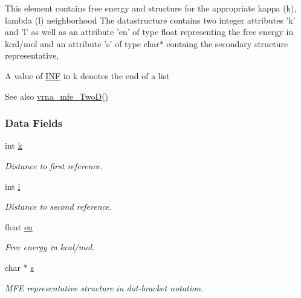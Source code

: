 This element contains free energy and structure for the appropriate kappa (k), lambda (l) neighborhood The datastructure contains two integer attributes 'k' and 'l' as well as an attribute 'en' of type float representing the free energy in kcal/mol and an attribute 's' of type char$\ast$ containg the secondary structure representative,

A value of \hyperlink{energy__const_8h_a12c2040f25d8e3a7b9e1c2024c618cb6}{I\+N\+F} in k denotes the end of a list

\begin{DoxySeeAlso}{See also}
\hyperlink{group__kl__neighborhood__mfe_ga243c288b463147352829df04de6a2f77}{vrna\+\_\+mfe\+\_\+\+Two\+D()} 
\end{DoxySeeAlso}
\subsubsection*{Data Fields}
\begin{DoxyCompactItemize}
\item 
\hypertarget{group__kl__neighborhood__mfe_ac111e850bb3b3a11b6b5707912cfa1b8}{int \hyperlink{group__kl__neighborhood__mfe_ac111e850bb3b3a11b6b5707912cfa1b8}{k}}\label{group__kl__neighborhood__mfe_ac111e850bb3b3a11b6b5707912cfa1b8}

\begin{DoxyCompactList}\small\item\em Distance to first reference. \end{DoxyCompactList}\item 
\hypertarget{group__kl__neighborhood__mfe_ab8e95cd920901175a2cc8de726ab1d36}{int \hyperlink{group__kl__neighborhood__mfe_ab8e95cd920901175a2cc8de726ab1d36}{l}}\label{group__kl__neighborhood__mfe_ab8e95cd920901175a2cc8de726ab1d36}

\begin{DoxyCompactList}\small\item\em Distance to second reference. \end{DoxyCompactList}\item 
\hypertarget{group__kl__neighborhood__mfe_a7577863a6a84224dfee39b321c03cab1}{float \hyperlink{group__kl__neighborhood__mfe_a7577863a6a84224dfee39b321c03cab1}{en}}\label{group__kl__neighborhood__mfe_a7577863a6a84224dfee39b321c03cab1}

\begin{DoxyCompactList}\small\item\em Free energy in kcal/mol. \end{DoxyCompactList}\item 
\hypertarget{group__kl__neighborhood__mfe_ac5942d2505a6cd7e4a8073a321d5d2d5}{char $\ast$ \hyperlink{group__kl__neighborhood__mfe_ac5942d2505a6cd7e4a8073a321d5d2d5}{s}}\label{group__kl__neighborhood__mfe_ac5942d2505a6cd7e4a8073a321d5d2d5}

\begin{DoxyCompactList}\small\item\em M\+F\+E representative structure in dot-\/bracket notation. \end{DoxyCompactList}\end{DoxyCompactItemize}
\label{structTwoDfold__vars}
\hypertarget{group__kl__neighborhood__mfe_structTwoDfold__vars}{}
